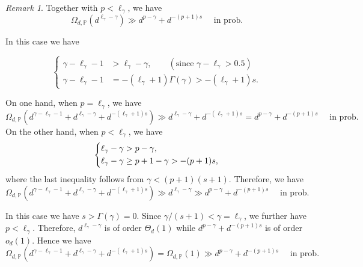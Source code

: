 \documentclass{article}
\theoremstyle{plain}
\theoremstyle{definition}
\theoremstyle{remark}
\newtheorem{remark}[theorem]{Remark}
\begin{document}
\begin{appendix}
\begin{remark}
Together with $p<\ell_\gamma$, we have
$$
\Omega_{d, \mathbb{P}} \left( 
d^{\ell_{\gamma} - \gamma}
\right)
\gg  
d^{p-\gamma} + 
    d^{-(p+1)s}
 \quad \text{ in prob.}
$$

 In this case we have

$$
\left\{
\begin{aligned}
\gamma - \ell_{\gamma} - 1
&> \ell_{\gamma} - \gamma,
\qquad (\text{since } \gamma - \ell_{\gamma} > 0.5)\\[4pt]
\gamma - \ell_{\gamma} - 1
&= -(\ell_{\gamma}+1)\Gamma(\gamma)
> -(\ell_{\gamma}+1)s.
\end{aligned}
\right.
$$

On one hand, when $p=\ell_{\gamma}$, we have
$$
\Omega_{d, \mathbb{P}} \left( 
d^{\gamma - \ell_{\gamma} - 1}
+ d^{\ell_{\gamma} - \gamma}
+ d^{-(\ell_{\gamma} + 1)  s}
\right)
\gg  
d^{\ell_{\gamma} - \gamma}
+ d^{-(\ell_{\gamma} + 1)  s}
=
d^{p-\gamma} + 
    d^{-(p+1)s}
 \quad \text{ in prob.}
$$
On the other hand, when $p<\ell_{\gamma}$, we have
$$
\left\{\begin{aligned}
& \ell_{\gamma} - \gamma > p - \gamma, \\
\vspace{3pt}
 &\ell_{\gamma} - \gamma \geq p + 1 - \gamma > -(p+1)s,
\end{aligned}\right.
$$
where the last inequality follows from $\gamma<(p+1)(s+1)$. 
Therefore, we have
$$
\Omega_{d, \mathbb{P}} \left( 
d^{\gamma - \ell_{\gamma} - 1}
+ d^{\ell_{\gamma} - \gamma}
+ d^{-(\ell_{\gamma} + 1)  s}
\right)
\gg  
d^{\ell_{\gamma} - \gamma}
\gg
d^{p-\gamma} + 
    d^{-(p+1)s}
 \quad \text{ in prob.}
$$



 In this case we have $s>\Gamma(\gamma)=0$. Since $\gamma / (s+1) < \gamma = \ell_{\gamma}$, we further have $p<\ell_{\gamma}$. Therefore, $d^{\ell_{\gamma} - \gamma}$ is of order $\Theta_d(1)$ while $d^{p-\gamma} + d^{-(p+1)s}$ is of order $o_d(1)$. Hence we have
$$
\Omega_{d, \mathbb{P}} \left( 
d^{\gamma - \ell_{\gamma} - 1}
+ d^{\ell_{\gamma} - \gamma}
+ d^{-(\ell_{\gamma} + 1)  s}
\right)
=  
\Omega_{d, \mathbb{P}}(1)
\gg
d^{p-\gamma} + 
    d^{-(p+1)s}
 \quad \text{ in prob.}
$$


\end{remark}
\end{appendix}
\end{document}
